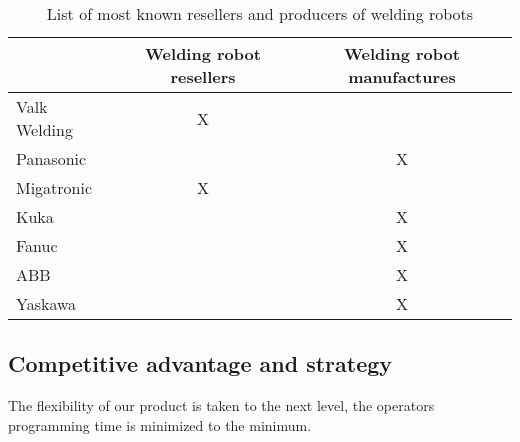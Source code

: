 \begin{table}[h]
\centering
\begin{tabular}{|l|c|c|}
\hline
             & Welding robot resellers & Welding robot manufactures \\ 
\hline
Valk Welding & X                       &  \\ 
\hline
Panasonic    &                         & X \\ 
\hline
Migatronic   & X                       &  \\ 
\hline
Kuka         &                         & X \\ 
\hline                                 
Fanuc        &                         & X \\ 
\hline                                 
ABB          &                         & X \\ 
\hline                                 
Yaskawa      &                         & X \\ 
\hline
\end{tabular} 
\caption{List of most known resellers and producers of welding robots}
\label{Tablecompetitors}
\end{table}


\subsection{Competitive advantage and strategy}
The flexibility of our product is taken to the next level, the operators programming time is minimized to the minimum. %
